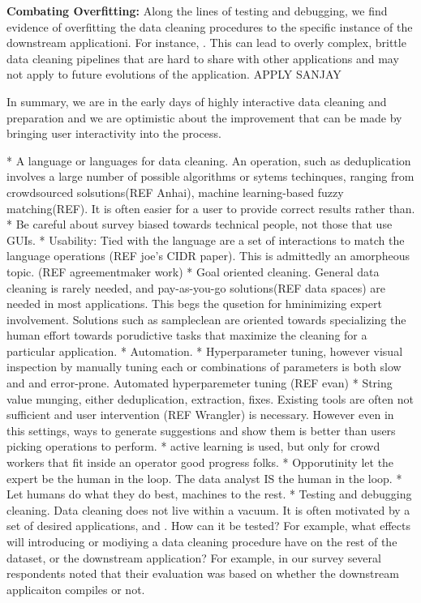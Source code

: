 \noindent\textbf{Combating Overfitting:} Along the lines of testing and debugging, we find evidence of overfitting the data cleaning procedures to the specific instance of the downstream applicationi.  For instance, {\color{red}{EXAMPLE}}.  This can lead to overly complex, brittle data cleaning pipelines that are hard to share with other applications and may not apply to future evolutions of the application.  APPLY SANJAY



In summary, we are in the early days of highly interactive data cleaning and preparation and we are optimistic about the improvement that can be made by bringing user interactivity into the process.


 
* A language or languages for data cleaning.  An operation, such as deduplication involves a large number of possible algorithms or sytems techinques, ranging from crowdsourced solsutions(REF Anhai), machine learning-based fuzzy matching(REF).  It is often easier for a user to provide correct results rather than.
* Be careful about survey biased towards technical people, not those that use GUIs. 
* Usability: Tied with the language are a set of interactions to match the language operations (REF joe’s CIDR paper).  This is admittedly an amorpheous topic.  (REF agreementmaker work)
* Goal oriented cleaning.  General data cleaning is rarely needed, and pay-as-you-go solutions(REF data spaces) are needed in most applications.   This begs the qusetion for hminimizing expert involvement.   Solutions such as sampleclean are oriented towards specializing the human effort towards porudictive tasks that maximize the cleaning for a particular application.  
* Automation. 
    * Hyperparameter tuning, however visual inspection by manually tuning each or combinations of parameters is both slow and and error-prone.  Automated hyperparemeter tuning (REF evan)
    * String value munging, either deduplication, extraction, fixes.  Existing tools are often not sufficient and user intervention (REF Wrangler) is necessary.  However even in this settings, ways to generate suggestions and show them is better than users picking operations to perform.
    * active learning is used, but only for crowd workers that fit inside an operator good progress folks.
    * Opporutinity let the expert be the human in the loop.  The data analyst IS the human in the loop.
    * Let humans do what they do best, machines to the rest.
* Testing and debugging cleaning.  Data cleaning does not live within a vacuum.  It is often motivated by a set of desired applications, and .  How can it be tested?  For example, what effects will introducing or modiying a data cleaning procedure have on the rest of the dataset, or the downstream application?  For example, in our survey several respondents noted that their evaluation was based on whether the downstream applicaiton compiles or not.

